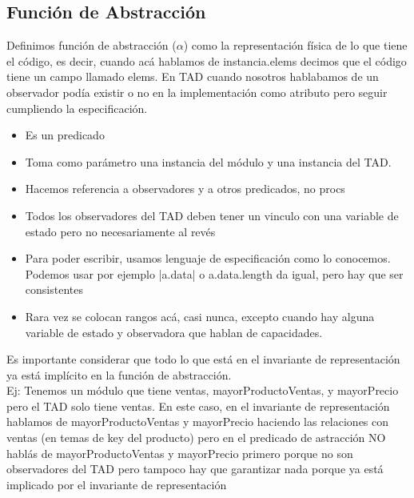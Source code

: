 \documentclass[10pt,a4paper]{article}
\begin{document}
\subsection*{Función de Abstracción}
Definimos función de abstracción (\(\alpha\)) como la representación física de lo que tiene el código, es decir, cuando acá hablamos de instancia.elems decimos que el código tiene un campo llamado elems. En TAD cuando nosotros hablabamos de un observador podía existir o no en la implementación como atributo pero seguir cumpliendo la especificación. \\
\begin{itemize}
    \item Es un predicado
    \item Toma como parámetro una instancia del módulo y una instancia del TAD.
    \item Hacemos referencia a observadores y a otros predicados, no procs
    \item Todos los observadores del TAD deben tener un vinculo con una variable de estado pero no necesariamente al revés
    \item Para poder escribir, usamos lenguaje de especificación como lo conocemos. Podemos usar por ejemplo |a.data| o a.data.length da igual, pero hay que ser consistentes
    \item Rara vez se colocan rangos acá, casi nunca, excepto cuando hay alguna variable de estado y observadora que hablan de capacidades.
\end{itemize}
Es importante considerar que todo lo que está en el invariante de representación ya está implícito en la función de abstracción. \\
Ej: Tenemos un módulo que tiene ventas, mayorProductoVentas, y mayorPrecio pero el TAD solo tiene ventas. En este caso, en el invariante de representación hablamos de mayorProductoVentas y mayorPrecio haciendo las relaciones con ventas (en temas de key del producto) pero en el predicado de astracción NO hablás de mayorProductoVentas y mayorPrecio primero porque no son observadores del TAD pero tampoco hay que garantizar nada porque ya está implicado por el invariante de representación
\end{document}
